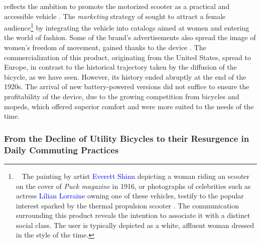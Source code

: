 \begin{refsegment}
{} reflects the ambition to promote the motorized scooter as a practical and accessible vehicle \textcolor{blue}{\autocite{smithsonian_magazine_motorized_2019}}. The \textsl{marketing} strategy of  sought to attract a female audience\footnote{~
    The painting by artist \textcolor{blue}{Everett Shinn} depicting a woman riding an  scooter on the cover of \textsl{Puck magazine} in 1916, or photographs of celebrities such as actress \textcolor{blue}{Lilian Lorraine} owning one of these vehicles, testify to the popular interest sparked by the thermal propulsion scooter \textcolor{blue}{\autocite{hemmings_look_2011}}. The communication surrounding this product reveals the intention to associate it with a distinct social class. The user is typically depicted as a white, affluent woman dressed in the style of the time.
} by integrating the vehicle into catalogs aimed at women and entering the world of fashion. Some of the brand's advertisements also spread the image of women's freedom of movement, gained thanks to the device \textcolor{blue}{\autocite{smithsonian_magazine_motorized_2019}}. The commercialization of this product, originating from the United States, spread to Europe, in contrast to the historical trajectory taken by the diffusion of the bicycle, as we have seen. However, its history ended abruptly at the end of the 1920s. The arrival of new battery-powered versions did not suffice to ensure the profitability of the device, due to the growing competition from bicycles and mopeds, which offered superior comfort and were more suited to the needs of the time.%

\subsubsection*{From the Decline of Utility Bicycles to their Resurgence in Daily Commuting Practices
    \label{chap1:proximite-velo-trottinette-declin-renaissance}
    }


\end{refsegment}
